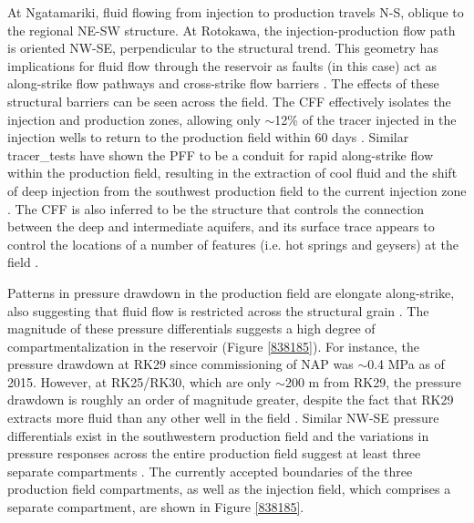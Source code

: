 At Ngatamariki, fluid flowing from injection to production travels N-S, oblique to the regional NE-SW structure. At Rotokawa, the injection-production flow path is oriented NW-SE, perpendicular to the structural trend. This geometry has implications for fluid flow through the reservoir as faults (in this case) act as along-strike flow pathways and cross-strike flow barriers \citep{Addison_2017stanford,McNamara_2015,Sewell_2015}. The effects of these structural barriers can be seen across the field. The \acrfull{CFF} effectively isolates the injection and production zones, allowing only $\sim$12\% of the tracer injected in the injection wells to return to the production field within 60 days \citep{Sewell_2015,addison2015rotokawa}. Similar \glspl{tracer_test} have shown the \acrfull{PFF} to be a conduit for rapid along-strike flow within the production field, resulting in the extraction of cool fluid and the shift of deep injection from the southwest production field to the current injection zone \citep{Sewell_2015,Addison_2017stanford}. The \acrfull{CFF} is also inferred to be the structure that controls the connection between the deep and intermediate aquifers, and its surface trace appears to control the locations of a number of features (i.e. hot springs and geysers) at the field \citep{winick2011natural}.

Patterns in pressure drawdown in the production field are elongate along-strike, also suggesting that fluid flow is restricted across the structural grain \citep{hernandez2015rotokawa,Sewell_2015,Quinao_2013stanford}. The magnitude of these pressure differentials suggests a high degree of compartmentalization in the reservoir (Figure \ref{838185}). For instance, the pressure drawdown at RK29 since commissioning of \acrshort{NAP} was $\sim$0.4 \acrshort{MPa} as of 2015. However, at RK25\slash{RK30}, which are only $\sim$200 m from RK29, the pressure drawdown is roughly an order of magnitude greater, despite the fact that RK29 extracts more fluid than any other well in the field \citep{Sewell_2015}. Similar NW-SE pressure differentials exist in the southwestern production field and the variations in pressure responses across the entire production field suggest at least three separate compartments \citep{hernandez2015rotokawa}. The currently accepted boundaries of the three production field compartments, as well as the injection field, which comprises a separate compartment, are shown in Figure \ref{838185}.

